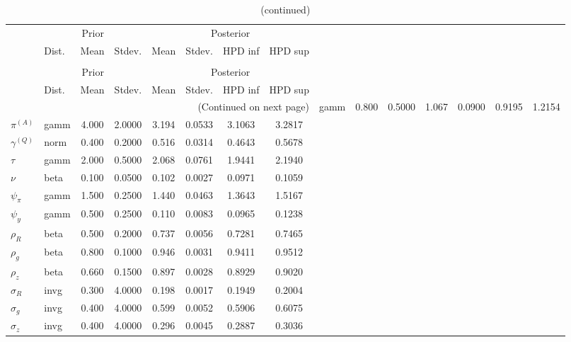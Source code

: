  
\begin{center}
\begin{longtable}{llcccccc} 
\caption{Results from Metropolis-Hastings (parameters)}
 \label{Table:MHPosterior:1}\\
\toprule 
  & \multicolumn{3}{c}{Prior}  &  \multicolumn{4}{c}{Posterior} \\
  \cmidrule(r{.75em}){2-4} \cmidrule(r{.75em}){5-8}
  & Dist. & Mean  & Stdev. & Mean & Stdev. & HPD inf & HPD sup\\
\midrule \endfirsthead 
\caption{(continued)}\\\toprule 
  & \multicolumn{3}{c}{Prior}  &  \multicolumn{4}{c}{Posterior} \\
  \cmidrule(r{.75em}){2-4} \cmidrule(r{.75em}){5-8}
  & Dist. & Mean  & Stdev. & Mean & Stdev. & HPD inf & HPD sup\\
\midrule \endhead 
\bottomrule \multicolumn{8}{r}{(Continued on next page)} \endfoot 
\bottomrule \endlastfoot 
${r_{A}}$ & gamm &   0.800 & 0.5000 &   1.067& 0.0900 &  0.9195 &  1.2154 \\ 
${\pi^{(A)}}$ & gamm &   4.000 & 2.0000 &   3.194& 0.0533 &  3.1063 &  3.2817 \\ 
${\gamma^{(Q)}}$ & norm &   0.400 & 0.2000 &   0.516& 0.0314 &  0.4643 &  0.5678 \\ 
${\tau}$ & gamm &   2.000 & 0.5000 &   2.068& 0.0761 &  1.9441 &  2.1940 \\ 
${\nu}$ & beta &   0.100 & 0.0500 &   0.102& 0.0027 &  0.0971 &  0.1059 \\ 
${\psi_\pi}$ & gamm &   1.500 & 0.2500 &   1.440& 0.0463 &  1.3643 &  1.5167 \\ 
${\psi_y}$ & gamm &   0.500 & 0.2500 &   0.110& 0.0083 &  0.0965 &  0.1238 \\ 
${\rho_R}$ & beta &   0.500 & 0.2000 &   0.737& 0.0056 &  0.7281 &  0.7465 \\ 
${\rho_{g}}$ & beta &   0.800 & 0.1000 &   0.946& 0.0031 &  0.9411 &  0.9512 \\ 
${\rho_z}$ & beta &   0.660 & 0.1500 &   0.897& 0.0028 &  0.8929 &  0.9020 \\ 
${\sigma_R}$ & invg &   0.300 & 4.0000 &   0.198& 0.0017 &  0.1949 &  0.2004 \\ 
${\sigma_{g}}$ & invg &   0.400 & 4.0000 &   0.599& 0.0052 &  0.5906 &  0.6075 \\ 
${\sigma_z}$ & invg &   0.400 & 4.0000 &   0.296& 0.0045 &  0.2887 &  0.3036 \\ 
\end{longtable}
 \end{center}
